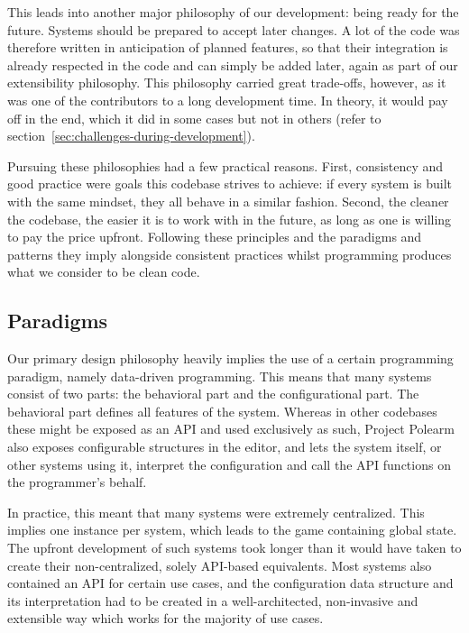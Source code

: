 \documentclass[../Main.tex]{subfiles}
\begin{document}
This leads into another major philosophy of our development: being ready for the future. Systems should be prepared to accept later changes. A lot of the code was therefore written in anticipation of planned features, so that their integration is already respected in the code and can simply be added later, again as part of our extensibility philosophy. This philosophy carried great trade-offs, however, as it was one of the contributors to a long development time. In theory, it would pay off in the end, which it did in some cases but not in others (refer to section~\ref{sec:challenges-during-development}).

Pursuing these philosophies had a few practical reasons. First, consistency and good practice were goals this codebase strives to achieve: if every system is built with the same mindset, they all behave in a similar fashion. Second, the cleaner the codebase, the easier it is to work with in the future, as long as one is willing to pay the price upfront. Following these principles and the paradigms and patterns they imply alongside consistent practices whilst programming produces what we consider to be clean code.

\subsection{Paradigms}\label{sec:paradigms}

Our primary design philosophy heavily implies the use of a certain programming paradigm, namely data-driven programming. This means that many systems consist of two parts: the behavioral part and the configurational part. The behavioral part defines all features of the system. Whereas in other codebases these might be exposed as an API and used exclusively as such, Project Polearm also exposes configurable structures in the editor, and lets the system itself, or other systems using it, interpret the configuration and call the API functions on the programmer's behalf.

In practice, this meant that many systems were extremely centralized. This implies one instance per system, which leads to the game containing global state. The upfront development of such systems took longer than it would have taken to create their non-centralized, solely API-based equivalents. Most systems also contained an API for certain use cases, and the configuration data structure and its interpretation had to be created in a well-architected, non-invasive and extensible way which works for the majority of use cases.
\end{document}
